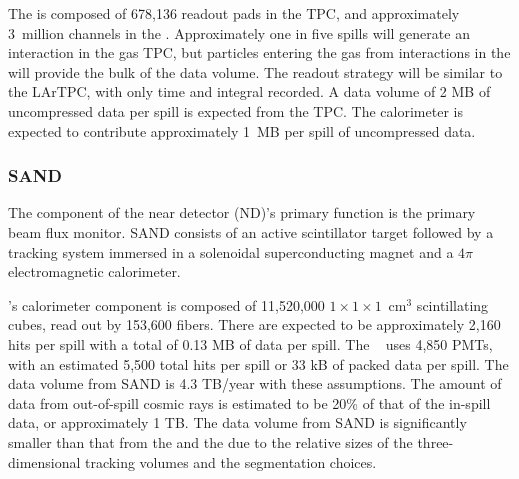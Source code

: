 The  is composed of 678,136 readout pads in the TPC, and approximately 3~million channels in the .  Approximately one in five spills will generate an interaction in the gas TPC, but particles entering the gas from interactions in the  will provide the bulk of the data volume.  The readout strategy will be similar to the LArTPC, with only time and integral recorded. A  data volume of 2 MB of uncompressed data per spill is expected from the TPC.  The calorimeter is expected to contribute approximately 1~MB per spill of uncompressed data.




\subsubsection{SAND}
\label{sec:comp-dataestimates-sand}

The  component of the near detector (ND)'s primary function is the primary beam flux monitor.   SAND consists of an active scintillator target  followed by a tracking system immersed in a solenoidal superconducting magnet  and  a $4\pi$ electromagnetic calorimeter.

's  calorimeter component is composed of 11,520,000 $1\times 1\times 1$~cm$^3$ scintillating cubes, read out by 153,600 fibers.  There are expected to be approximately 2,160 hits per spill with a total of 0.13 MB of data per spill.  The  ~\cite{Adinolfi:2002zx} uses 4,850 PMTs, with an estimated 5,500 total hits per spill or 33 kB of packed data per spill.   The data volume from SAND is 4.3 TB/year with these assumptions.  The amount of data from out-of-spill cosmic rays is estimated to be 20\% of that of the in-spill data, or approximately 1 TB.  The data volume from SAND is significantly smaller than that from the  and the  due to the relative sizes of the three-dimensional tracking volumes and the segmentation choices.

